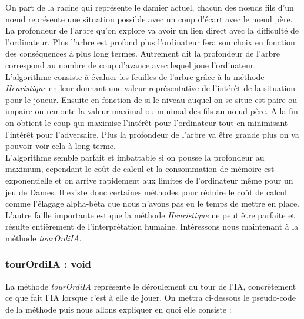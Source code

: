 \documentclass[12,french]{report}
\begin{document}
On part de la racine qui représente le damier actuel, chacun des nœuds fils d'un nœud représente une situation possible avec un coup d'écart avec le nœud père. La profondeur de l'arbre qu'on explore va avoir un lien direct avec la difficulté de l'ordinateur. Plus l'arbre est profond plus l'ordinateur fera son choix en fonction des conséquences à plus long termes. Autrement dit la profondeur de l'arbre correspond au nombre de coup d'avance avec lequel joue l'ordinateur. \\

L'algorithme consiste à évaluer les feuilles de l'arbre grâce à la méthode \textit{Heuristique} en leur donnant une valeur représentative de l'intérêt de la situation pour le joueur. Ensuite en fonction de si le niveau auquel on se situe est paire ou impaire on remonte la valeur maximal ou minimal des fils au nœud père. A la fin on obtient le coup qui maximise l'intérêt pour l'ordinateur tout en minimisant l’intérêt pour l'adversaire. Plus la profondeur de l'arbre va être grande plus on va pouvoir voir cela à long terme.\\

L’algorithme semble parfait et imbattable si on pousse la profondeur au maximum, cependant le coût de calcul et la consommation de mémoire est exponentielle et on arrive rapidement aux limites de l'ordinateur même pour un jeu de Dames. Il existe donc certaines méthodes pour réduire le coût de calcul comme l'élagage alpha-bêta que nous n'avons pas eu le temps de mettre en place.\\

L'autre faille importante est que la méthode \textit{Heuristique} ne peut être parfaite et résulte entièrement de l'interprétation humaine. Intéressons nous maintenant à la méthode \textit{tourOrdiIA}.\\

\subsubsection{tourOrdiIA : void}

La méthode \textit{tourOrdiIA} représente le déroulement du tour de l'IA, concrètement ce que fait l'IA lorsque c'est à elle de jouer. On mettra ci-dessous le pseudo-code de la méthode puis nous allons expliquer en quoi elle consiste :
\end{document}
